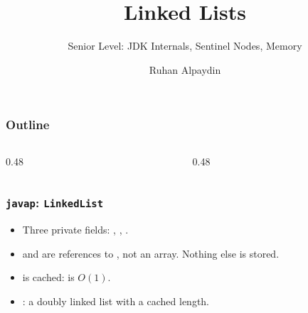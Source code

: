\documentclass[aspectratio=169,10pt,compress]{beamer}
\title{Linked Lists}
\subtitle{Senior Level: JDK Internals, Sentinel Nodes, Memory}
\author[Bingol]{Ruhan Alpaydin}
\institute[FCIS]{
    Faculty of Computer and Information Sciences\\
    Yeditepe University
}
\date{
	{\tiny \hbTimeStamp}
}
\begin{document}
\begin{frame}[t,fragile]
  \titlepage
\end{frame}




\begin{frame}[t,fragile] \frametitle{Outline}
  \begin{columns}[T]
    \begin{column}{0.48\textwidth}
      \tableofcontents[sections={1-3}, hideallsubsections]
    \end{column}
    \begin{column}{0.48\textwidth}
      \tableofcontents[sections={4-5}, hideallsubsections]
    \end{column}
  \end{columns}
\end{frame}





\begin{frame}[t,fragile] \frametitle{\texttt{javap}: \texttt{LinkedList}}
  \begin{itemize}\small
    \item Three private fields: , , .
    \item {} and  are references to ,
          not an array. Nothing else is stored.
    \item {} is cached:  is $O(1)$.
    \item {}:
          a doubly linked list with a cached length.
  \end{itemize}
\end{frame}
\end{document}
